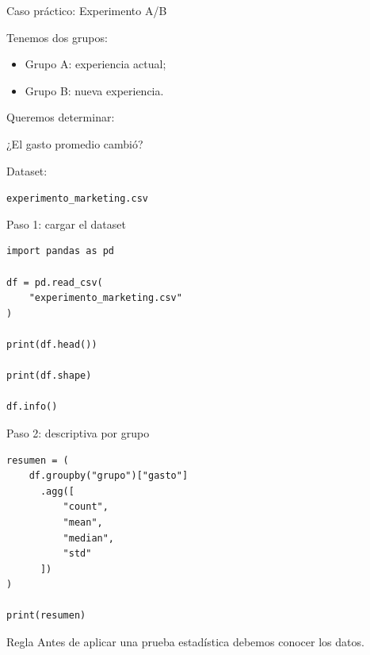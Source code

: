 \documentclass[aspectratio=169,11pt]{beamer}
\begin{document}
\begin{frame}{Caso práctico: Experimento A/B}

Tenemos dos grupos:

\begin{itemize}

    \item Grupo A: experiencia actual;

    \item Grupo B: nueva experiencia.

\end{itemize}

Queremos determinar:

\begin{center}

\Large
¿El gasto promedio cambió?

\end{center}

Dataset:

\begin{center}

\texttt{experimento\_marketing.csv}

\end{center}

\end{frame}


\begin{frame}[fragile]{Paso 1: cargar el dataset}

\begin{lstlisting}
import pandas as pd

df = pd.read_csv(
    "experimento_marketing.csv"
)

print(df.head())

print(df.shape)

df.info()
\end{lstlisting}

\end{frame}


\begin{frame}[fragile]{Paso 2: descriptiva por grupo}

\begin{lstlisting}
resumen = (
    df.groupby("grupo")["gasto"]
      .agg([
          "count",
          "mean",
          "median",
          "std"
      ])
)

print(resumen)
\end{lstlisting}

\begin{block}{Regla}
Antes de aplicar una prueba estadística debemos conocer los datos.
\end{block}

\end{frame}
\end{document}
